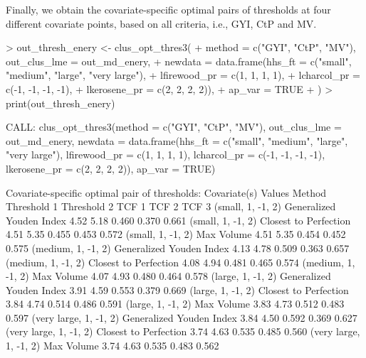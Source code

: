 Finally, we obtain the covariate-specific optimal pairs of thresholds at four different covariate points, based on all criteria, i.e., GYI, CtP and MV.
\begin{example}
> out_thresh_enery <- clus_opt_thres3(
+   method = c("GYI", "CtP", "MV"), out_clus_lme = out_md_enery,
+   newdata = data.frame(hhs_ft = c("small", "medium", "large", "very large"), 
+                        lfirewood_pr = c(1, 1, 1, 1), 
+                        lcharcol_pr = c(-1, -1, -1, -1), 
+                        lkerosene_pr = c(2, 2, 2, 2)),
+   ap_var = TRUE
+ )
> print(out_thresh_enery)

CALL: clus_opt_thres3(method = c("GYI", "CtP", "MV"), out_clus_lme = out_md_enery, 
    newdata = data.frame(hhs_ft = c("small", "medium", "large", 
        "very large"), lfirewood_pr = c(1, 1, 1, 1), lcharcol_pr = c(-1, 
        -1, -1, -1), lkerosene_pr = c(2, 2, 2, 2)), ap_var = TRUE)
 
Covariate-specific optimal pair of thresholds: 
    Covariate(s) Values                   Method Threshold 1 Threshold 2 TCF 1 TCF 2 TCF 3
      (small, 1, -1, 2) Generalized Youden Index        4.52        5.18 0.460 0.370 0.661
      (small, 1, -1, 2)    Closest to Perfection        4.51        5.35 0.455 0.453 0.572
      (small, 1, -1, 2)               Max Volume        4.51        5.35 0.454 0.452 0.575
     (medium, 1, -1, 2) Generalized Youden Index        4.13        4.78 0.509 0.363 0.657
     (medium, 1, -1, 2)    Closest to Perfection        4.08        4.94 0.481 0.465 0.574
     (medium, 1, -1, 2)               Max Volume        4.07        4.93 0.480 0.464 0.578
      (large, 1, -1, 2) Generalized Youden Index        3.91        4.59 0.553 0.379 0.669
      (large, 1, -1, 2)    Closest to Perfection        3.84        4.74 0.514 0.486 0.591
      (large, 1, -1, 2)               Max Volume        3.83        4.73 0.512 0.483 0.597
 (very large, 1, -1, 2) Generalized Youden Index        3.84        4.50 0.592 0.369 0.627
 (very large, 1, -1, 2)    Closest to Perfection        3.74        4.63 0.535 0.485 0.560
 (very large, 1, -1, 2)               Max Volume        3.74        4.63 0.535 0.483 0.562


\end{example}
